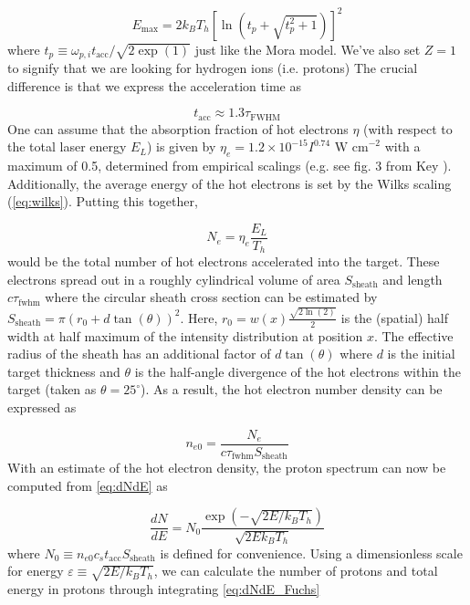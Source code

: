 \begin{equation}
	E_\text{max} = 2 k_B T_h [\ln(t_p + \sqrt{t_p^2 + 1})]^2 \label{eq:fuchs_maxE}
\end{equation}
where $t_p \equiv \omega_{p,i} t_\text{acc} / \sqrt{2 \exp(1)}$ just like the Mora model. We've also set $Z=1$ to signify that we are looking for hydrogen ions (i.e. protons) The crucial difference is that we express the acceleration time as 

\begin{equation}
	t_\text{acc} \approx 1.3 \tau_\text{FWHM} \label{eq:fuchs_multiplier}
\end{equation}
One can assume that the absorption fraction of hot electrons $\eta$ (with respect to the total laser energy $E_L$) is given by $\eta_e = 1.2 \times 10^{-15} I^{0.74} \text{ W cm}^{-2}$ with a maximum of 0.5, determined from empirical scalings (e.g. see fig. 3 from Key \cite{Key_1998_PoP}). Additionally, the average energy of the hot electrons is set by the Wilks scaling (\autoref{eq:wilks}). Putting this together, 

\begin{equation}
	N_e = \eta_e \frac{E_L}{T_h}
\end{equation}
would be the total number of hot electrons accelerated into the target. These electrons spread out in a roughly cylindrical volume of area $S_\text{sheath}$ and length $c \tau_\text{fwhm}$ where the circular sheath cross section can be estimated by $S_\text{sheath} = \pi (r_0 + d \tan(\theta))^2$. Here, $r_0 = w(x) \frac{\sqrt{2 \ln(2)}}{2}$ is the (spatial) half width at half maximum of the intensity distribution at position $x$. The effective radius of the sheath has an additional factor of $d \tan(\theta)$ where $d$ is the initial target thickness and $\theta$ is the half-angle divergence of the hot electrons within the target (taken as $\theta = 25^\circ$). As a result, the hot electron number density can be expressed as 
	
\begin{equation}
	n_{e0} = \frac{N_e}{c \tau_\text{fwhm} S_\text{sheath}}
\end{equation}
With an estimate of the hot electron density, the proton spectrum can now be computed from \cref{eq:dNdE} as 

\begin{equation}
	\frac{dN}{dE} = N_0 \frac{\exp(-\sqrt{2 E/k_B T_h})}{\sqrt{2 E k_B T_h}} \label{eq:dNdE_Fuchs}
\end{equation}
where $N_0 \equiv n_{e0} c_s t_\text{acc} S_\text{sheath}$ is defined for convenience. Using a dimensionless scale for energy $\varepsilon \equiv \sqrt{2 E / k_B T_h}$, we can calculate the number of protons and total energy in protons through integrating \autoref{eq:dNdE_Fuchs}


